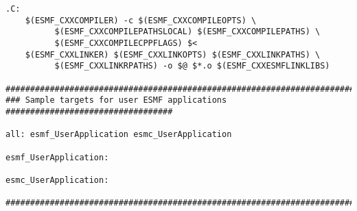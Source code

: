 \begin{verbatim}
.C:
	$(ESMF_CXXCOMPILER) -c $(ESMF_CXXCOMPILEOPTS) \
          $(ESMF_CXXCOMPILEPATHSLOCAL) $(ESMF_CXXCOMPILEPATHS) \
          $(ESMF_CXXCOMPILECPPFLAGS) $<
	$(ESMF_CXXLINKER) $(ESMF_CXXLINKOPTS) $(ESMF_CXXLINKPATHS) \
          $(ESMF_CXXLINKRPATHS) -o $@ $*.o $(ESMF_CXXESMFLINKLIBS)

################################################################################
### Sample targets for user ESMF applications ##################################

all: esmf_UserApplication esmc_UserApplication

esmf_UserApplication:

esmc_UserApplication:

################################################################################

\end{verbatim}
